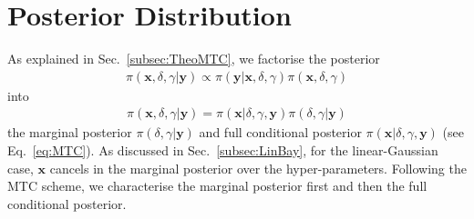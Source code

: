 \section{Posterior Distribution}
\label{sec:FirstO3Post}
As explained in Sec.~\ref{subsec:TheoMTC}, we factorise the posterior
\begin{align}
	\pi( \bm{x}, \delta, \gamma| \bm{y}) \propto \pi(\bm{y}| \bm{x},\delta,\gamma) \pi( \bm{x},  \delta,\gamma)
\end{align}
into 
\begin{align}
	\pi( \bm{x},  \delta,\gamma| \bm{y}) =\pi( \bm{x}| \delta,\gamma, \bm{y})\pi( \delta,\gamma | \bm{y})
\end{align}
the marginal posterior $\pi(\delta ,\gamma| \bm{y})$ and full conditional posterior $\pi( \bm{x}| \delta,\gamma, \bm{y})$ (see Eq.~\ref{eq:MTC}).
As discussed in Sec.~\ref{subsec:LinBay}, for the linear-Gaussian case, $\bm{x}$ cancels in the marginal posterior over the hyper-parameters.
Following the MTC scheme, we characterise the marginal posterior first and then the full conditional posterior.

